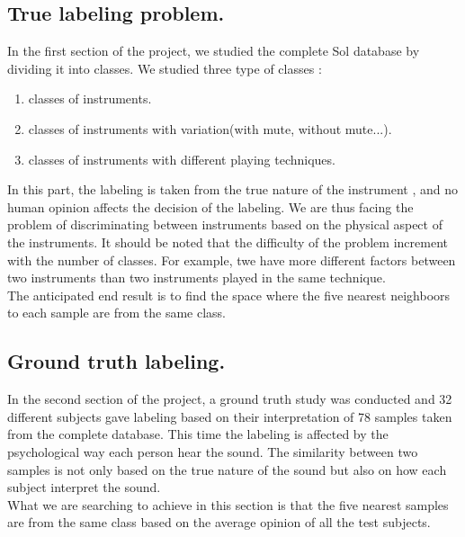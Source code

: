 \documentclass[hidelinks,12pt]{report}
\begin{document}
\subsection{True labeling problem.}
In the first section of the project, we studied the complete Sol database by dividing it into classes. We studied three type of classes :
\begin{enumerate}
\item classes of instruments.
\item classes of instruments with variation(with mute, without mute...).
\item classes of instruments with different playing techniques.
\end{enumerate}
In this part, the labeling is taken from the true nature of the instrument , and no human opinion affects the decision of the labeling. We are thus facing the problem of discriminating between instruments based on the physical aspect of the instruments. It should be noted that the difficulty of the problem increment with the number of classes. For example, twe have more different factors between two instruments than two instruments played in the same technique.\\ The anticipated end result is to find the space where the five nearest neighboors to each sample are from the same class.

\subsection{Ground truth labeling.}
In the second section of the project, a ground truth study was conducted and 32 different subjects gave labeling based on their interpretation of 78 samples taken from the complete database. This time the labeling is affected by the psychological way each person hear the sound. The similarity between two samples is not only based on the true nature of the sound but also on how each subject interpret the sound.\\ What we are searching to achieve in this section is that the five nearest samples are from the same class based on the average opinion of all the test subjects.
\end{document}
